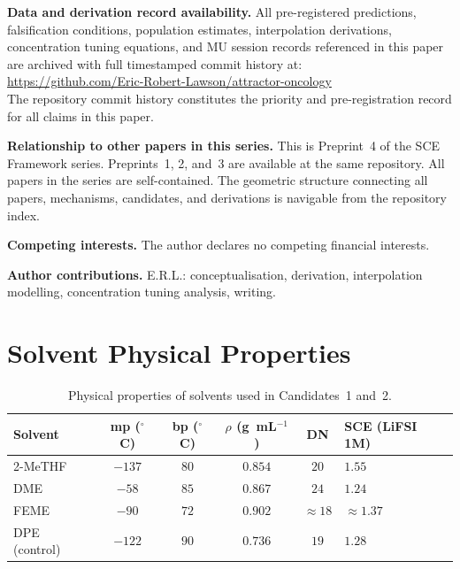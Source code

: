\documentclass[11pt]{article}
\theoremstyle{plain}
\theoremstyle{definition}
\theoremstyle{remark}
\begin{document}
\bigskip
\noindent\textbf{Data and derivation record availability.}
All pre-registered predictions, falsification conditions, population
estimates, interpolation derivations, concentration tuning equations,
and MU session records referenced in this paper are archived with
full timestamped commit history at:\\
\url{https://github.com/Eric-Robert-Lawson/attractor-oncology}\\
The repository commit history constitutes the priority and
pre-registration record for all claims in this paper.

\noindent\textbf{Relationship to other papers in this series.}
This is Preprint~4 of the SCE Framework series.
Preprints~1, 2, and~3 are available at the same repository.
All papers in the series are self-contained.  The geometric structure
connecting all papers, mechanisms, candidates, and derivations is
navigable from the repository index.

\noindent\textbf{Competing interests.}
The author declares no competing financial interests.

\noindent\textbf{Author contributions.}
E.R.L.: conceptualisation, derivation, interpolation modelling,
concentration tuning analysis, writing.

\appendix

\section{Solvent Physical Properties}
\label{app:props}

\begin{table}[h!]
\centering
\caption{Physical properties of solvents used in Candidates~1 and~2.}
\label{tab:props}
\begin{tabular}{lccccl}
\toprule
Solvent & mp ($^\circ$C) & bp ($^\circ$C) &
  $\rho$ (g~mL$^{-1}$) & DN & SCE (LiFSI 1M) \\
\midrule
2-MeTHF & $-137$ & $80$ & $0.854$ & $20$ & $1.55$ \\
DME & $-58$ & $85$ & $0.867$ & $24$ & $1.24$ \\
FEME & $-90$ & $72$ & $0.902$ & $\approx 18$ & $\approx 1.37$ \\
DPE (control) & $-122$ & $90$ & $0.736$ & $19$ & $1.28$ \\
\bottomrule
\end{tabular}
\end{table}
\end{document}
